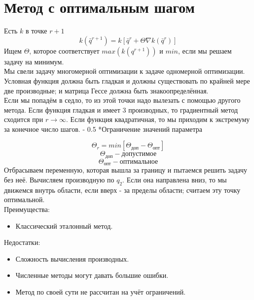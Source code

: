 \documentclass[12pt,a5paper]{scrbook}
\makeatletter
\renewcommand\paragraph{\@startsection{paragraph}{4}{0mm}%
{-\baselineskip} %
{0.5\baselineskip} %
{\normalfont\bfseries}}%
\makeatother
\begin{document}
  \section{Метод с оптимальным шагом}
  Есть $k$ в точке $r+1$
  $$k(\bar{q}^{r+1}) = k[\bar{q}^r + \Theta\nabla k(\bar{q}^r)]$$
  Ищем $\Theta$, которое соответствует $max(k(q^{r+1}))$ и $min$, если мы решаем задачу на минимум.\\
  Мы свели задачу многомерной оптимизации к задаче одномерной оптимизации. Условная функция должна быть гладкая и должны существовать по крайней мере две производные; и матрица Гессе должна быть знакоопределённая.\\
  Если мы попадём в седло, то из этой точки надо вылезать с помощью другого метода. Если функция гладкая и имеет 3 производных, то градиентный метод сходится при $r \rightarrow \infty$. Если функция квадратичная, то мы приходим к экстремуму за конечное число шагов.
  \paragraph*{Ограничение значений параметра}
  $$\Theta_r = min[\Theta_{\text{доп}} - \Theta_{\text{опт}}]$$
  $$\Theta_{\text{доп}} - \text{допустимое}$$
  $$\Theta_{\text{опт}} - \text{оптимальное}$$
  Отбрасываем переменную, которая вышла за границу и пытаемся решить задачу без неё. Вычисляем производную по $q_2$. Если она направлена вниз, то мы движемся внутрь области, если вверх - за пределы области; считаем эту точку оптимальной.\\
  Преимущества: 
  \begin{itemize}
    \item Классический эталонный метод.
  \end{itemize}
  Недостатки: 
  \begin{itemize}
    \item Сложность вычисления производных.
    \item Численные методы могут давать большие ошибки.
    \item Метод по своей сути не рассчитан на учёт ограничений.
  \end{itemize}
\end{document}
